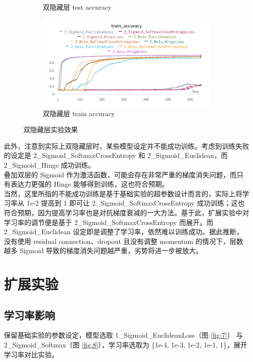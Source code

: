 \documentclass{article}
\begin{document}
\begin{figure}[htbp]
\begin{subfigure}{0.475\textwidth}
		\caption{双隐藏层 test accuracy}
	\end{subfigure}
	\begin{subfigure}{0.475\textwidth}
		\centering
		\includegraphics[width=1\textwidth]{../pics/双层实验-train_acc.png}
		\caption{双隐藏层 train accuracy}
	\end{subfigure}
	\caption{双隐藏层实验效果}
	\label{fig:6}
\end{figure}

此外，注意到实际上双隐藏层时，某些模型设定并不能成功训练。考虑到训练失败的设定是 2\_Sigmoid\_SoftmaxCrossEntropy 和 2\_Sigmoid\_Euclidean，而 2\_Sigmoid\_Hinge 成功训练。\\
叠加双层的 Sigmoid 作为激活函数，可能会存在非常严重的梯度消失问题，而只有表达力更强的 Hinge 能够得到训练，这也符合预期。\\
当然，这里所指的不能成功训练是基于基础实验的超参数设计而言的，实际上将学习率从 1e-2 提高到 1 即可让 2\_Sigmoid\_SoftmaxCrossEntropy 成功训练；这也符合预期，因为提高学习率也是对抗梯度衰减的一大方法。基于此，扩展实验中对学习率的调节便是基于 2\_Sigmoid\_SoftmaxCrossEntropy 而展开。而 2\_Sigmoid\_Euclidean 设定即是调整了学习率，依然难以训练成功。据此推断，没有使用 residual connection、dropout 且没有调整 momentum 的情况下，层数越多 Sigmoid 导致的梯度消失问题越严重，劣势将进一步被放大。

\section{扩展实验}

\subsection{学习率影响}

保留基础实验的参数设定，模型选取 1\_Sigmoid\_EuclideanLoss（图 \ref{fig:7}） 与 2\_Sigmoid\_Softmax（图 \ref{fig:8}），学习率选取为 \{1e-4, 1e-3, 1e-2, 1e-1, 1\}，展开学习率对比实验。
\end{document}
